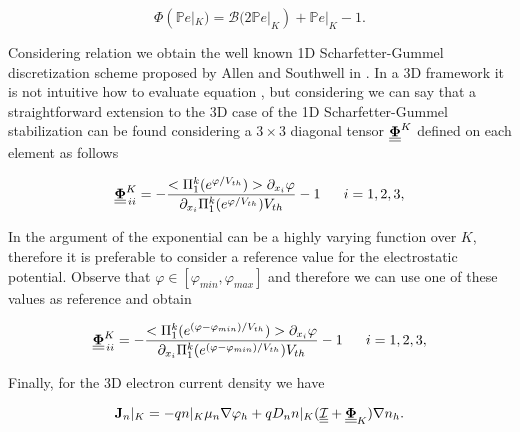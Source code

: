 \begin{equation}
\label{eq: SG stabilization function}
\Phi(\mathbb{P}e|_K) = \mathcal{B}(2\mathbb{P}e|_K) + \mathbb{P}e|_K -1.
\end{equation}


Considering relation  we obtain the well known 1D Scharfetter-Gummel discretization scheme proposed by Allen and Southwell in \cite{Allen:SGformula}.
In a 3D framework it is not intuitive how to evaluate equation , but considering   we can say that a straightforward extension to the 3D case of the 1D Scharfetter-Gummel stabilization can be found considering a $3\times 3$ diagonal tensor  $\underline{\underline{\mathbf{\Phi}}}^K$  defined on each element as follows

\begin{equation}
\label{eq: SG stabilized}
\underline{\underline{\vect{\Phi}}}^K_{\, ii} = -\dfrac{<\Pi_1^k(e^{\varphi/V_{th}})> \partial_{x_i}\varphi}{\partial_{x_i}\Pi_1^k(e^{\varphi/V_{th}})V_{th}} -1 \psp{10} i = 1,2,3,
\end{equation}

In  the argument of the exponential can be a highly varying function over $K$, therefore it is preferable to consider a reference value for the electrostatic potential.
 Observe that $\varphi \in [\varphi_{min},\varphi_{max}]$ and therefore we can use one of these values as reference and obtain
 
 \begin{equation}
\label{eq: SG stabilized}
\underline{\underline{\vect{\Phi}}}^K_{\, ii}  = -\dfrac{<\Pi_1^k(e^{(\varphi-\varphi_{min})/V_{th}})> \partial_{x_i}\varphi}{\partial_{x_i}\Pi_1^k(e^{(\varphi-\varphi_{min})/V_{th}})V_{th}} -1 \psp{10} i = 1,2,3,
\end{equation}

Finally, for the 3D electron current density we have

\begin{equation}
\mathbf{J}_n|_K = -qn|_K\mu_n\nabla \varphi_h + qD_nn|_K(\underline{\underline{\mathcal{I}}}+\underline{\underline{\mathbf{\Phi}}}_K) \nabla n_h.
\end{equation}

